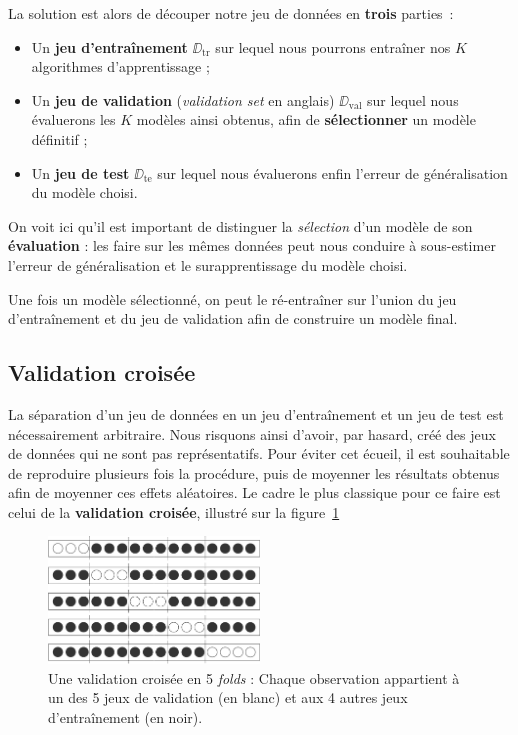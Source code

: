La solution est alors de découper notre jeu de données en \textbf{trois} parties~:
\begin{itemize}
\item Un \textbf{jeu d'entraînement}
  $\DD_{\text{tr}}$ sur lequel nous pourrons entraîner nos $K$ algorithmes
  d'apprentissage ;
\item Un \textbf{jeu de validation} ({\it validation set} en anglais)
  $\DD_{\text{val}}$ sur lequel nous évaluerons les $K$ modèles ainsi
  obtenus, afin de \textbf{sélectionner} un modèle définitif ;
\item Un \textbf{jeu de test} $\DD_{\text{te}}$ sur lequel nous évaluerons enfin
  l'erreur de généralisation du modèle choisi.
\end{itemize}

On voit ici qu'il est important de distinguer la {\it sélection} d'un modèle de
son \textbf{évaluation} : les faire sur les mêmes données peut nous conduire à
sous-estimer l'erreur de généralisation et le surapprentissage du modèle
choisi.

Une fois un modèle sélectionné, on peut le ré-entraîner sur l'union du jeu
d'entraînement et du jeu de validation afin de construire un modèle final.

\subsection{Validation croisée}
\label{sec:crossval}
La séparation d'un jeu de données en un jeu d'entraînement et un jeu de test
est nécessairement arbitraire. Nous risquons ainsi d'avoir, par hasard, créé
des jeux de données qui ne sont pas représentatifs. Pour éviter cet écueil, il
est souhaitable de reproduire plusieurs fois la procédure, puis de moyenner les
résultats obtenus afin de moyenner ces effets aléatoires. Le cadre le plus
classique pour ce faire est celui de la \textbf{validation croisée}, illustré sur
la figure~\ref{fig:crossval}

\begin{figure}[h]
  \centering
  \includegraphics[width=0.5\textwidth]{figures/generalisation/crossval}
  \caption{Une validation croisée en 5 {\it folds} : Chaque observation
    appartient à un des 5 jeux de validation (en blanc) et aux 4 autres jeux
    d'entraînement (en noir).}
  \label{fig:crossval}
\end{figure}

